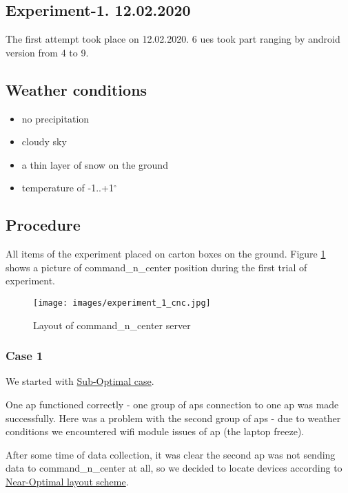 \subsection{Experiment-1. 12.02.2020}\label{experiment-1.-12.02.2020}

The first attempt took place on 12.02.2020. 6 \Glspl{ue} took part ranging by \gls{android} version from 4 to 9.

\subsection{Weather conditions}

\begin{itemize}
\tightlist
\item
  no precipitation
\item
  cloudy sky
\item
  a thin layer of snow on the ground
\item
  temperature of -1..+1$^\circ$
\end{itemize}

\subsection{Procedure}

All items of the experiment placed on carton boxes on the ground. Figure \ref{fig:cnc-position} shows a picture of \gls{command_n_center} position during the first trial of experiment.

\begin{figure}[H]
	\centering
	\texttt{[image: images/experiment\_1\_cnc.jpg]}
\caption{Layout of \gls{command_n_center} server}
\label{fig:cnc-position}
\end{figure}

\subsubsection{Case 1}

We started with \hyperref[sub-optimal-layout]{Sub-Optimal case}.

One \gls{ap} functioned correctly - one group of \glspl{ap} connection to one \gls{ap} was made successfully.
Here was a problem with the second group of \glspl{ap} - due to weather conditions we encountered \gls{wifi} module issues of \gls{ap} (the laptop freeze).

After some time of data collection, it was clear the second \gls{ap} was not sending data to \gls{command_n_center} at all, so we decided to locate devices according to \hyperref[near-optimal-layout]{Near-Optimal layout scheme}.

